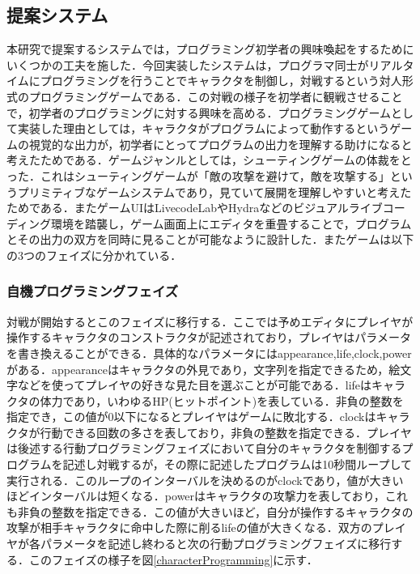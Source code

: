 \subsection{提案システム}

本研究で提案するシステムでは，プログラミング初学者の興味喚起をするためにいくつかの工夫を施した．今回実装したシステムは，プログラマ同士がリアルタイムにプログラミングを行うことでキャラクタを制御し，対戦するという対人形式のプログラミングゲームである．この対戦の様子を初学者に観戦させることで，初学者のプログラミングに対する興味を高める．プログラミングゲームとして実装した理由としては，キャラクタがプログラムによって動作するというゲームの視覚的な出力が，初学者にとってプログラムの出力を理解する助けになると考えたためである．ゲームジャンルとしては，シューティングゲームの体裁をとった．これはシューティングゲームが「敵の攻撃を避けて，敵を攻撃する」というプリミティブなゲームシステムであり，見ていて展開を理解しやすいと考えたためである．またゲームUIはLivecodeLabやHydraなどのビジュアルライブコーディング環境を踏襲し，ゲーム画面上にエディタを重畳することで，プログラムとその出力の双方を同時に見ることが可能なように設計した．またゲームは以下の3つのフェイズに分かれている．

\subsubsection{自機プログラミングフェイズ}
対戦が開始するとこのフェイズに移行する．ここでは予めエディタにプレイヤが操作するキャラクタのコンストラクタが記述されており，プレイヤはパラメータを書き換えることができる．具体的なパラメータにはappearance,life,clock,powerがある．appearanceはキャラクタの外見であり，文字列を指定できるため，絵文字などを使ってプレイヤの好きな見た目を選ぶことが可能である．lifeはキャラクタの体力であり，いわゆるHP(ヒットポイント)を表している．非負の整数を指定でき，この値が0以下になるとプレイヤはゲームに敗北する．clockはキャラクタが行動できる回数の多さを表しており，非負の整数を指定できる．プレイヤは後述する行動プログラミングフェイズにおいて自分のキャラクタを制御するプログラムを記述し対戦するが，その際に記述したプログラムは10秒間ループして実行される．このループのインターバルを決めるのがclockであり，値が大きいほどインターバルは短くなる．powerはキャラクタの攻撃力を表しており，これも非負の整数を指定できる．この値が大きいほど，自分が操作するキャラクタの攻撃が相手キャラクタに命中した際に削るlifeの値が大きくなる．双方のプレイヤが各パラメータを記述し終わると次の行動プログラミングフェイズに移行する．このフェイズの様子を図\ref{characterProgramming}に示す．

